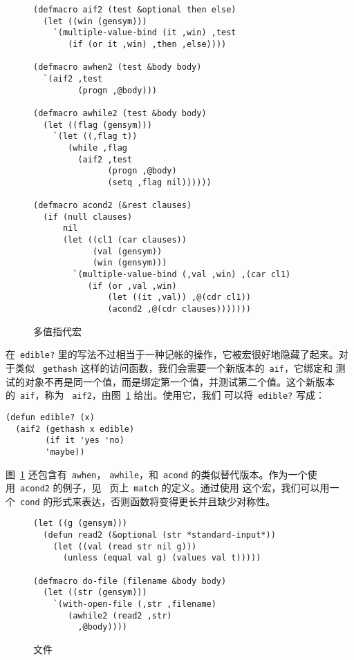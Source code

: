 \begin{figure}
\begin{lstlisting}
(defmacro aif2 (test &optional then else)
  (let ((win (gensym)))
    `(multiple-value-bind (it ,win) ,test
       (if (or it ,win) ,then ,else))))

(defmacro awhen2 (test &body body)
  `(aif2 ,test
         (progn ,@body)))

(defmacro awhile2 (test &body body)
  (let ((flag (gensym)))
    `(let ((,flag t))
       (while ,flag
         (aif2 ,test
               (progn ,@body)
               (setq ,flag nil))))))

(defmacro acond2 (&rest clauses)
  (if (null clauses)
      nil
      (let ((cl1 (car clauses))
            (val (gensym))
            (win (gensym)))
        `(multiple-value-bind (,val ,win) ,(car cl1)
           (if (or ,val ,win)
               (let ((it ,val)) ,@(cdr cl1))
               (acond2 ,@(cdr clauses)))))))
\end{lstlisting}
  \caption{多值指代宏}
  \label{fig:multiple-value_anaphoric_macros}
\end{figure}

在~\texttt{edible?} 里的写法不过相当于一种记帐的操作，它被宏很好地隐藏了起来。对于类似
~\texttt{gethash} 这样的访问函数，我们会需要一个新版本的~\texttt{aif}，它绑定和
测试的对象不再是同一个值，而是绑定第一个值，并测试第二个值。这个新版本的~\texttt{aif}，称为
~\texttt{aif2}，由图~\ref{fig:multiple-value_anaphoric_macros} 给出。使用它，我们
可以将~\texttt{edible?} 写成：
\begin{lstlisting}
(defun edible? (x)
  (aif2 (gethash x edible)
        (if it 'yes 'no)
        'maybe))
\end{lstlisting}

图~\ref{fig:multiple-value_anaphoric_macros} 还包含有~\texttt{awhen}，
\texttt{awhile}，和~\texttt{acond} 的类似替代版本。作为一个使用~\texttt{acond2}
的例子，见~\pageref{fig:matching_function} 页上~\texttt{match} 的定义。通过使用
这个宏，我们可以用一个~\texttt{cond} 的形式来表达，否则函数将变得更长并且缺少对称性。

\begin{figure}
\begin{lstlisting}
(let ((g (gensym)))
  (defun read2 (&optional (str *standard-input*))
    (let ((val (read str nil g)))
      (unless (equal val g) (values val t)))))

(defmacro do-file (filename &body body)
  (let ((str (gensym)))
    `(with-open-file (,str ,filename)
       (awhile2 (read2 ,str)
         ,@body))))
\end{lstlisting}
  \caption{文件\utility}
  \label{fig:file_utilities}
\end{figure}

